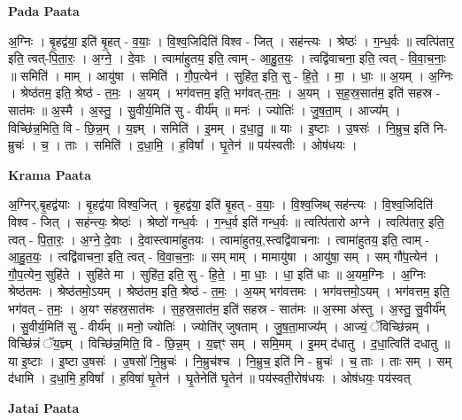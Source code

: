 \documentclass[17pt]{extarticle}
\begin{document}
\textbf{Pada Paata} \newline

अ॒ग्निः । बृ॒हद्व॑या॒ इति॑ बृ॒हत् - व॒याः॒ । वि॒श्व॒जिदिति॑ विश्व - जित् । सह॑न्त्यः । श्रेष्ठः॑ । ग॒न्ध॒र्वः ॥ त्वत्पि॑तार॒ इति॒ त्वत्-पि॒ता॒रः॒ । अ॒ग्ने॒ । दे॒वाः । त्वामा॑हुतय॒ इति॒ त्वाम् - आ॒हु॒त॒यः॒ । त्वद्वि॑वाचना॒ इति॒ त्वत् - वि॒वा॒च॒नाः॒ ॥ समिति॑ । माम् । आयु॑षा । समिति॑ । गौ॒प॒त्येन॑ । सुहि॑त॒ इति॒ सु - हि॒ते॒ । मा॒ । धाः॒ ॥ अ॒यम् । अ॒ग्निः । श्रेष्ठ॑तम॒ इति॒ श्रेष्ठ॑ - त॒मः॒ । अ॒यम् । भग॑वत्तम॒ इति॒ भग॑वत्-त॒मः॒ । अ॒यम् । स॒ह॒स्र॒सात॑म॒ इति॑ सहस्र - सात॑मः ॥ अ॒स्मै । अ॒स्तु॒ । सु॒वीर्य॒मिति॑ सु - वीर्य᳚म् ॥ मनः॑ । ज्योतिः॑ । जु॒ष॒ता॒म् । आज्य᳚म् । विच्छि॑न्न॒मिति॒ वि - छि॒न्न॒म् । य॒ज्ञ्म् । समिति॑ । इ॒मम् । द॒धा॒तु॒ ॥ याः । इ॒ष्टाः । उ॒षसः॑ । नि॒म्रुच॒ इति॑ नि-म्रुचः॑ । च॒ । ताः । समिति॑ । द॒धा॒मि॒ । ह॒विषा᳚ । घृ॒तेन॑ ॥ पय॑स्वतीः । ओष॑धयः ।  \newline


\textbf{Krama Paata} \newline

अ॒ग्निर्,बृ॒हद्व॑याः । बृ॒हद्व॑या विश्व॒जित् । बृ॒हद्व॑या॒ इति॑ बृ॒हत् - व॒याः॒ । वि॒श्व॒जिथ् सह॑न्त्यः । वि॒श्व॒जिदिति॑ विश्व - जित् । सह॑न्त्यः॒ श्रेष्ठः॑ । श्रेष्ठो॑ गन्ध॒र्वः । ग॒न्ध॒र्व इति॑ गन्ध॒र्वः ॥ त्वत्पि॑तारो अग्ने । त्वत्पि॑तार॒ इति॒ त्वत् - पि॒ता॒रः॒ । अ॒ग्ने॒ दे॒वाः । दे॒वास्त्वामा॑हुतयः । त्वामा॑हुतय॒,स्त्वद्वि॑वाचनाः । त्वामा॑हुतय॒ इति॒ त्वाम् - आ॒हु॒त॒यः॒ । त्वद्वि॑वाचना॒ इति॒ त्वत् - वि॒वा॒च॒नाः॒ ॥ सम् माम् । मामायु॑षा । आयु॑षा॒ सम् । सम् गौ॑प॒त्येन॑ । गौ॒प॒त्येन॒ सुहि॑ते । सुहि॑ते मा । सुहि॑त॒ इति॒ सु - हि॒ते॒ । मा॒ धाः॒ । धा॒ इति॑ धाः ॥ अ॒यम॒ग्निः । अ॒ग्निः श्रेष्ठ॑तमः । श्रेष्ठ॑तमो॒ऽयम् । श्रेष्ठ॑तम॒ इति॒ श्रेष्ठ॑ - त॒मः॒ । अ॒यम् भग॑वत्तमः । भग॑वत्तमो॒ऽयम् । भग॑वत्तम॒ इति॒ भग॑वत् - त॒मः॒ । अ॒यꣳ स॑हस्र॒सात॑मः । स॒ह॒स्र॒सात॑म॒ इति॑ सहस्र - सात॑मः ॥ अ॒स्मा अ॑स्तु । अ॒स्तु॒ सु॒वीर्य᳚म् । सु॒वीर्य॒मिति॑ सु - वीर्य᳚म् ॥ मनो॒ ज्योतिः॑ । ज्योति॑र् जुषताम् । जु॒ष॒ता॒माज्य᳚म् । आज्यं॒ ॅविच्छि॑न्नम् । विच्छि॑न्नं ॅय॒ज्ञ्म् । विच्छि॑न्न॒मिति॒ वि - छि॒न्न॒म् । य॒ज्ञ्ꣳ सम् । समि॒मम् । इ॒मम् द॑धातु । द॒धा॒त्विति॑ दधातु ॥ या इ॒ष्टाः । इ॒ष्टा उ॒षसः॑ । उ॒षसो॑ नि॒म्रुचः॑ । नि॒म्रुच॑श्च । नि॒म्रुच॒ इति॑ नि - म्रुचः॑ । च॒ ताः । ताः सम् । सम् द॑धामि । द॒धा॒मि॒ ह॒विषा᳚ । ह॒विषा॑ घृ॒तेन॑ । घृ॒तेनेति॑ घृ॒तेन॑ ॥ पय॑स्वती॒रोष॑धयः । ओष॑धयः॒ पय॑स्वत् \newline

\textbf{Jatai Paata} \newline
\end{document}

